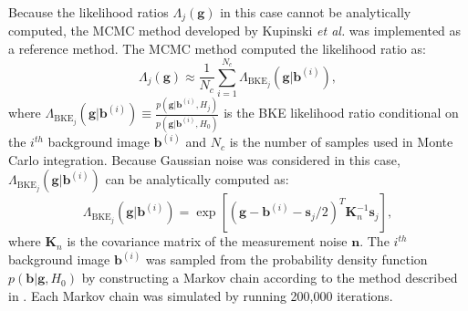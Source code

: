 \documentclass[journal]{IEEEtran}
\renewcommand{\vec}[1]{\mathbf{#1}}
\begin{document}
Because the likelihood ratios $\Lambda_j(\vec{g})$ in this case cannot be analytically computed,
 the MCMC method developed by Kupinski \emph{et al.}\cite{kupinski2003ideal} was
 implemented  as a reference method.
The MCMC method computed the likelihood ratio as:
\begin{equation}
\Lambda_j(\vec{g}) \approx \frac{1}{N_c}\sum_{i=1}^{N_c} \Lambda_{\text{BKE}_j}(\vec{g}|\vec{b}^{(i)}),
\end{equation}
where $\Lambda_{\text{BKE}_j}(\vec{g}|\vec{b}^{(i)})\equiv \frac{p(\vec{g}|\vec{b}^{(i)}, H_j)}{p(\vec{g}|\vec{b}^{(i)}, H_0)}$ is the BKE likelihood ratio conditional on the $i^{th}$ background image $\vec{b}^{(i)}$
and $N_c$ is the number of samples used in Monte Carlo integration.
Because Gaussian noise was considered in this case, $\Lambda_{\text{BKE}_j}(\vec{g}|\vec{b}^{(i)})$ can be analytically computed as:
\begin{equation}
\Lambda_{\text{BKE}_j}(\vec{g}|\vec{b}^{(i)}) = \exp \left[(\vec{g}-\vec{b}^{(i)}-\vec{s}_j/2)^T\mathbf{K}_n^{-1}\vec{s}_j \right],
\end{equation}
where $\mathbf{K}_n$ is the covariance matrix of the measurement noise $\vec{n}$.
The $i^{th}$ background image $\vec{b}^{(i)}$ was sampled from the probability density function $p(\vec{b}|\vec{g}, H_0)$ by constructing a Markov chain according to the method described in \cite{kupinski2003ideal}.
Each Markov chain was simulated by running 200,000 iterations. 

\vspace{0.8cm}
\end{document}

